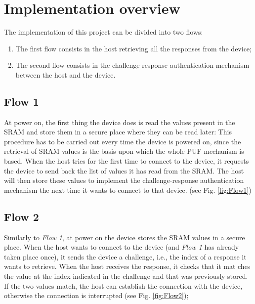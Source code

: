 

\section{Implementation overview}
The implementation of this project can be divided into two flows:
\begin{enumerate}
	\item The first flow consists in the host retrieving all the responses from the device;


	\item The second flow consists in the challenge-response authentication mechanism between the host and the device.
\end{enumerate}


\subsection {Flow 1} \label{subsection:flow1}
At power on, the first thing the device does is read the values present in the SRAM and store them in a secure place where they can be read later: This procedure has to be carried out every time the device is powered on, since the retrieval of SRAM values is the basis upon which the whole PUF mechanism is based.
When the host tries for the first time to connect to the device, it requests the device to send back the list of values it has read from the SRAM. The host will then store these values to implement the  challenge-response authentication mechanism the next time it wants to connect to that device. (see Fig. \ref{fig:Flow1})


\subsection {Flow 2} \label{subsection:flow2}
Similarly to \emph{Flow 1}, at power on the device stores the SRAM values in a secure place. When the host wants to connect to the device (and \emph{Flow 1} has already taken place once), it sends the device a challenge, i.e., the index of a response it wants to retrieve. When the host receives the response, it checks that it mat
ches the value at the index indicated in the challenge and that was previously stored. If the two values match, the host can establish the connection with the device, otherwise the connection is interrupted (see Fig. \ref{fig:Flow2});

